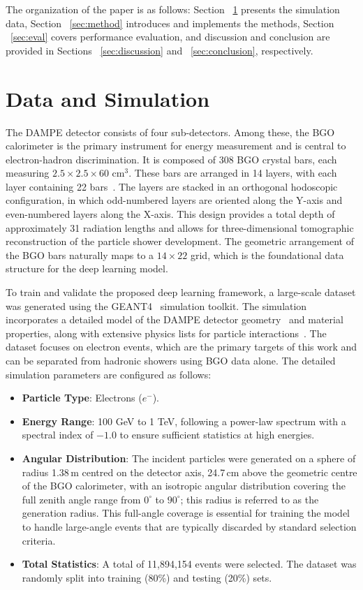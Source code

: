 \documentclass[preprint,12pt]{elsarticle}
\begin{document}
The organization of the paper is as follows: Section ~\ref{sec:data} presents the simulation data, Section ~\ref{sec:method} introduces and implements the methods, Section ~\ref{sec:eval} covers performance evaluation, and discussion and conclusion are provided in Sections ~\ref{sec:discussion} and ~\ref{sec:conclusion}, respectively.


\section{Data and Simulation}
\label{sec:data}

The DAMPE detector consists of four sub-detectors.
Among these, the BGO calorimeter is the primary instrument for energy measurement and is central to electron-hadron discrimination. It is composed of 308 BGO crystal bars, each measuring $2.5 \times 2.5 \times 60 \text{ cm}^3$. These bars are arranged in 14 layers, with each layer containing 22 bars~\cite{dampe_mission, dampe_bgo_calib}. The layers are stacked in an orthogonal hodoscopic configuration, in which odd-numbered layers are oriented along the Y-axis and even-numbered layers along the X-axis. This design provides a total depth of approximately 31 radiation lengths and allows for three-dimensional tomographic reconstruction of the particle shower development. The geometric arrangement of the BGO bars naturally maps to a $14 \times 22$ grid, which is the foundational data structure for the deep learning model.

To train and validate the proposed deep learning framework, a large-scale dataset was generated using the GEANT4~\cite{geant4_2016} simulation toolkit. The simulation incorporates a detailed model of the DAMPE detector geometry~\cite{dampe_stk_soft} and material properties, along with extensive physics lists for particle interactions~\cite{ftfp_model1, ftfp_model2, bertini_cascade}. The dataset focuses on electron events, which are the primary targets of this work and can be separated from hadronic showers using BGO data alone. The detailed simulation parameters are configured as follows:
\begin{itemize}
    \item \textbf{Particle Type}: Electrons ($e^-$).
    \item \textbf{Energy Range}: 100 GeV to 1 TeV, following a power-law spectrum with a spectral index of $-1.0$ to ensure sufficient statistics at high energies.
    \item \textbf{Angular Distribution}: The incident particles were generated on a sphere of radius 1.38\,m centred on the detector axis, 24.7\,cm above the geometric centre of the BGO calorimeter, with an isotropic angular distribution covering the full zenith angle range from $0^{\circ}$ to $90^{\circ}$; this radius is referred to as the generation radius. This full-angle coverage is essential for training the model to handle large-angle events that are typically discarded by standard selection criteria.
    \item \textbf{Total Statistics}: A total of 11,894,154 events were selected. The dataset was randomly split into training (80\%) and testing (20\%) sets.
\end{itemize}
\end{document}
